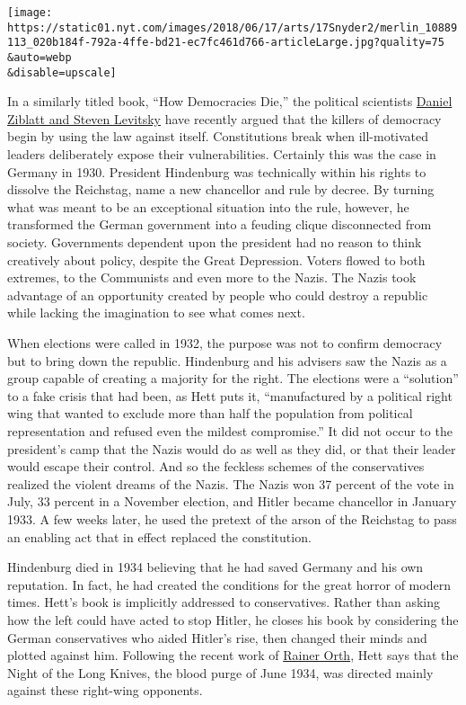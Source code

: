 \texttt{[image: https://static01.nyt.com/images/2018/06/17/arts/17Snyder2/merlin\_10889113\_020b184f-792a-4ffe-bd21-ec7fc461d766-articleLarge.jpg?quality=75\\\&auto=webp\\\&disable=upscale]}

In a similarly titled book, ``How Democracies Die,'' the political
scientists
\href{https://www.theguardian.com/us-news/commentisfree/2018/jan/21/this-is-how-democracies-die}{Daniel
Ziblatt and Steven Levitsky} have recently argued that the killers of
democracy begin by using the law against itself. Constitutions break
when ill-motivated leaders deliberately expose their vulnerabilities.
Certainly this was the case in Germany in 1930. President Hindenburg was
technically within his rights to dissolve the Reichstag, name a new
chancellor and rule by decree. By turning what was meant to be an
exceptional situation into the rule, however, he transformed the German
government into a feuding clique disconnected from society. Governments
dependent upon the president had no reason to think creatively about
policy, despite the Great Depression. Voters flowed to both extremes, to
the Communists and even more to the Nazis. The Nazis took advantage of
an opportunity created by people who could destroy a republic while
lacking the imagination to see what comes next.

When elections were called in 1932, the purpose was not to confirm
democracy but to bring down the republic. Hindenburg and his advisers
saw the Nazis as a group capable of creating a majority for the right.
The elections were a ``solution'' to a fake crisis that had been, as
Hett puts it, ``manufactured by a political right wing that wanted to
exclude more than half the population from political representation and
refused even the mildest compromise.'' It did not occur to the
president's camp that the Nazis would do as well as they did, or that
their leader would escape their control. And so the feckless schemes of
the conservatives realized the violent dreams of the Nazis. The Nazis
won 37 percent of the vote in July, 33 percent in a November election,
and Hitler became chancellor in January 1933. A few weeks later, he used
the pretext of the arson of the Reichstag to pass an enabling act that
in effect replaced the constitution.

Hindenburg died in 1934 believing that he had saved Germany and his own
reputation. In fact, he had created the conditions for the great horror
of modern times. Hett's book is implicitly addressed to conservatives.
Rather than asking how the left could have acted to stop Hitler, he
closes his book by considering the German conservatives who aided
Hitler's rise, then changed their minds and plotted against him.
Following the recent work of
\href{https://www.cambridge.org/core/journals/central-european-history/article/der-amtssitz-der-opposition-politik-und-staatsumbauplane-im-buro-des-stellvertreters-des-reichskanzlers-in-den-jahren-19331934-by-rainer-orth-cologne-bohlau-verlag-2016-pp-1118-cloth-9000-isbn-9783412505554/C1E87000AC4D05F29CED7E3BE26E512A}{Rainer
Orth}, Hett says that the Night of the Long Knives, the blood purge of
June 1934, was directed mainly against these right-wing opponents.

